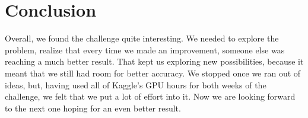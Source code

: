 \documentclass[a4paper,11pt]{article}
\numberwithin{equation}{section}
\begin{document}
\section*{Conclusion}
Overall, we found the challenge quite interesting. We needed to explore the problem, realize that every time we made an improvement, someone else was reaching a much better result. That kept us exploring new possibilities, because it meant that we still had room for better accuracy. We stopped once we ran out of ideas, but, having used all of Kaggle's GPU hours for both weeks of the challenge, we felt that we put a lot of effort into it. Now we are looking forward to the next one hoping for an even better result.
\end{document}

